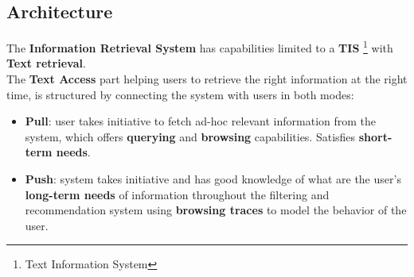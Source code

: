 \documentclass[12pt]{spieman}  %
\begin{document}
\begin{spacing}{1}
    \section{Architecture}\label{sec:architecture}

    The \textbf{Information Retrieval System} has capabilities limited to a
    \textbf{TIS} \footnote{Text Information System}
    with \textbf{Text retrieval}.\\
    The \textbf{Text Access} part helping users to retrieve the right information at the right time,
    is structured by connecting the system with users in both modes:
    \begin{itemize}
        \item \textbf{Pull}: user takes initiative to fetch ad-hoc relevant information from the system,
              which offers \textbf{querying} and \textbf{browsing} capabilities.
              Satisfies \textbf{short-term needs}.
        \item \textbf{Push}: system takes initiative and has good knowledge of what are the user's
              \textbf{long-term needs} of information throughout the filtering and recommendation system
              using \textbf{browsing traces} to model the behavior of the user.
    \end{itemize}


\end{spacing}
\end{document}
